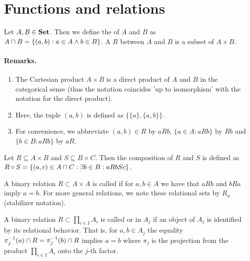 \documentclass[8pt,a4paper]{article}
\begin{document}
\section{Functions and relations}

\begin{definition}
Let $A, B\in\mathbf{Set}$. Then we define the  of $A$
and $B$ as $A\mathbin{\sqcap} B = \{(a,b):a\in A\wedge b\in B\}$.
A  $R$ between $A$ and $B$ is a subset of $A\times B$.
\end{definition}

\paragraph{Remarks.}
\begin{enumerate}
\item The Cartesian product $A\times B$ is a direct product of $A$ and $B$
in the categorical sense (thus the notation coincides 'up to
isomorphism' with the notation for the direct product).
\item Here, the
tuple $(a,b)$ is defined as $\{\{a\},\{a,b\}\}$.
\item For convenience, we abbreviate $(a,b)\in R$ by $aRb$, $\{a\in A:
  aRb\}$ by $Rb$ and $\{b\in B: aRb\}$ by $aR$.
\end{enumerate}

\begin{definition}
Let $R\subseteq A\times B$ and $S\subseteq B\times C$. Then the
composition of $R$ and $S$ is defined as $R\circ S = \{(a,c)\in
A\mathbin{\sqcap} C: \exists b\in B: aRbSc\}$.
\end{definition}

\begin{definition}[antisymmetric]
A binary relation $R\subset A\times A$ is called 
if for $a,b\in A$ we have that $aRb$ and $bRa$ imply $a=b$.
For more general relations, we note these relational sets by $R_a$
(stabilizer notation).
\end{definition}

\begin{definition}
A binary relation $R\subset \prod_{i\in I}{A_i}$ is called 
or  in $A_j$ if an object of $A_j$ is identified by its relational
behavior. That is, for $a,b\in A_j$ the equality
$\pi_j^{-1}(a)\cap R=\pi_j^{-1}(b)\cap R$ implies $a=b$
where $\pi_j$ is the projection from the product $\prod_{i\in
  I}{A_i}$ onto the $j$-th factor.
\end{definition}
\end{document}
